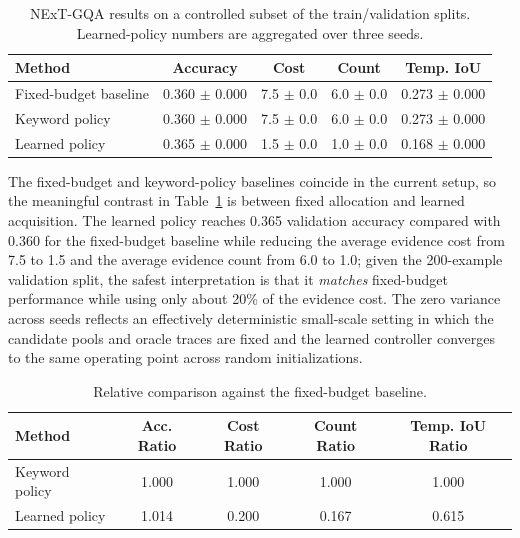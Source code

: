 \documentclass{article}
\begin{document}
\begin{table}[t]
  \centering
  \scriptsize
  \caption{NExT-GQA results on a controlled subset of the train/validation splits. Learned-policy numbers are aggregated over three seeds.}
  \label{tab:nextgqa-results}
  \begin{tabular}{lcccc}
    \toprule
    Method & Accuracy & Cost & Count & Temp. IoU \\
    \midrule
    Fixed-budget baseline & 0.360 $\pm$ 0.000 & 7.5 $\pm$ 0.0 & 6.0 $\pm$ 0.0 & 0.273 $\pm$ 0.000 \\
    Keyword policy & 0.360 $\pm$ 0.000 & 7.5 $\pm$ 0.0 & 6.0 $\pm$ 0.0 & 0.273 $\pm$ 0.000 \\
    Learned policy & 0.365 $\pm$ 0.000 & 1.5 $\pm$ 0.0 & 1.0 $\pm$ 0.0 & 0.168 $\pm$ 0.000 \\
    \bottomrule
  \end{tabular}
\end{table}

The fixed-budget and keyword-policy baselines coincide in the current setup, so the meaningful contrast in Table~\ref{tab:nextgqa-results} is between fixed allocation and learned acquisition. The learned policy reaches 0.365 validation accuracy compared with 0.360 for the fixed-budget baseline while reducing the average evidence cost from 7.5 to 1.5 and the average evidence count from 6.0 to 1.0; given the 200-example validation split, the safest interpretation is that it \emph{matches} fixed-budget performance while using only about 20\% of the evidence cost. The zero variance across seeds reflects an effectively deterministic small-scale setting in which the candidate pools and oracle traces are fixed and the learned controller converges to the same operating point across random initializations.

\begin{table}[t]
  \centering
  \scriptsize
  \caption{Relative comparison against the fixed-budget baseline.}
  \label{tab:relative-results}
  \begin{tabular}{lcccc}
    \toprule
    Method & Acc. Ratio & Cost Ratio & Count Ratio & Temp. IoU Ratio \\
    \midrule
    Keyword policy & 1.000 & 1.000 & 1.000 & 1.000 \\
    Learned policy & 1.014 & 0.200 & 0.167 & 0.615 \\
    \bottomrule
  \end{tabular}
\end{table}
\end{document}

